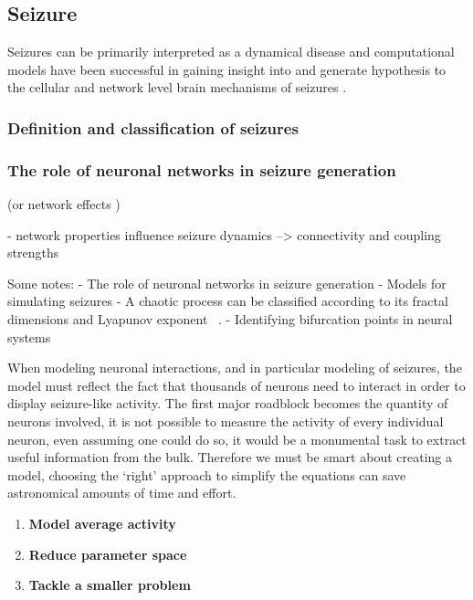 





\subsection*{Seizure}
Seizures can be primarily interpreted as a dynamical disease \cite{DaSilva2003, Milton2010} and computational models have been successful in gaining insight into and generate hypothesis to the cellular and network level brain mechanisms of seizures \cite{Baladron2012}.

\subsubsection*{Definition and classification of seizures}



\subsubsection{The role of neuronal networks in seizure generation}
(or network effects )

- network properties influence seizure dynamics --> connectivity and coupling strengths


Some notes:
- The role of neuronal networks in seizure generation
- Models for simulating seizures
- A chaotic process can be classified according to its fractal dimensions and Lyapunov exponent ~\cite{DaSilva2003}.
- Identifying bifurcation points in neural systems 



When modeling neuronal interactions, and in particular modeling of seizures, the model must reflect the fact that thousands of neurons need to interact in order to display seizure-like activity. 
The first major roadblock becomes the quantity of neurons involved, it is not possible to measure the activity of every individual neuron, even assuming one could do so, it would be a monumental task to extract useful information from the bulk. 
Therefore we must be smart about creating a model, choosing the `right' approach to simplify the equations can save astronomical amounts of time and effort.
\begin{enumerate}
    \item \textbf{Model average activity}
    \item \textbf{Reduce parameter space}
    \item \textbf{Tackle a smaller problem}
\end{enumerate}


